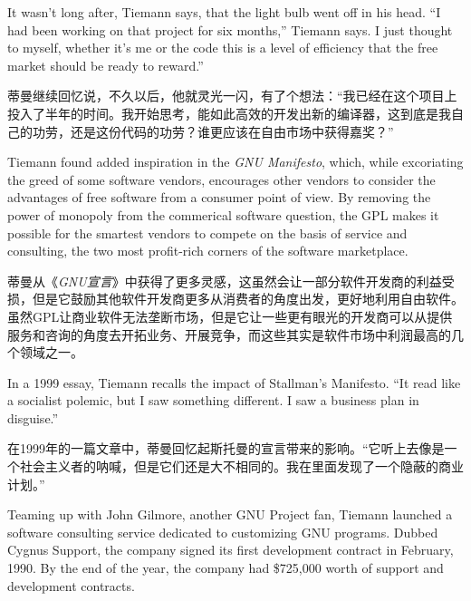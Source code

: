 \ifdefined\eng
It wasn't long after, Tiemann says, that the light bulb went off in his head. ``I had been working on that project for six months,'' Tiemann says. I just thought to myself, whether it's me or the code this is a level of efficiency that the free market should be ready to reward.''
\fi

\ifdefined\chs
蒂曼继续回忆说，不久以后，他就灵光一闪，有了个想法：``我已经在这个项目上投入了半年的时间。我开始思考，能如此高效的开发出新的编译器，这到底是我自己的功劳，还是这份代码的功劳？谁更应该在自由市场中获得嘉奖？''
\fi

\ifdefined\eng
Tiemann found added inspiration in the \textit{GNU Manifesto}, which, while excoriating the greed of some software vendors, encourages other vendors to consider the advantages of free software from a consumer point of view. By removing the power of monopoly from the commerical software question, the GPL makes it possible for the smartest vendors to compete on the basis of service and consulting, the two most profit-rich corners of the software marketplace.
\fi

\ifdefined\chs
蒂曼从《\textit{GNU宣言}》中获得了更多灵感，这虽然会让一部分软件开发商的利益受损，但是它鼓励其他软件开发商更多从消费者的角度出发，更好地利用自由软件。虽然GPL让商业软件无法垄断市场，但是它让一些更有眼光的开发商可以从提供服务和咨询的角度去开拓业务、开展竞争，而这些其实是软件市场中利润最高的几个领域之一。
\fi

\ifdefined\eng
In a 1999 essay, Tiemann recalls the impact of Stallman's Manifesto. ``It read like a socialist polemic, but I saw something different. I saw a business plan in disguise.''
\fi

\ifdefined\chs
在1999年的一篇文章中，蒂曼回忆起斯托曼的宣言带来的影响。``它听上去像是一个社会主义者的呐喊，但是它们还是大不相同的。我在里面发现了一个隐蔽的商业计划。''
\fi

\ifdefined\eng
Teaming up with John Gilmore, another GNU Project fan, Tiemann launched a software consulting service dedicated to customizing GNU programs. Dubbed Cygnus Support, the company signed its first development contract in February, 1990. By the end of the year, the company had \$725,000 worth of support and development contracts.
\fi

